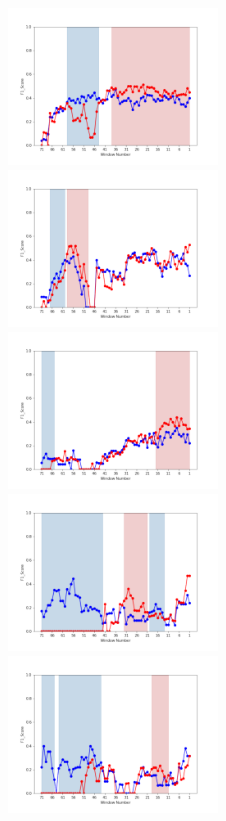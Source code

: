 \documentclass[submit]{ipsj}
\begin{document}
\begin{figure}[t]
\begin{center}
    \includegraphics[width=0.495\textwidth]{Uenaka_fig/RQ2_result/Nova/Nova_merge_F1.pdf}
    \includegraphics[width=0.495\textwidth]{Uenaka_fig/RQ2_result/Neutron/Neutron_merge_F1.pdf}
    \includegraphics[width=0.495\textwidth]{Uenaka_fig/RQ2_result/Cinder/Cinder_merge_F1.pdf}
    \includegraphics[width=0.495\textwidth]{Uenaka_fig/RQ2_result/Keystone/Keystone_merge_F1.pdf}
    \includegraphics[width=0.495\textwidth]{Uenaka_fig/RQ2_result/Swift/Swift_merge_F1.pdf}

\end{center}
\end{figure}
\end{document}
